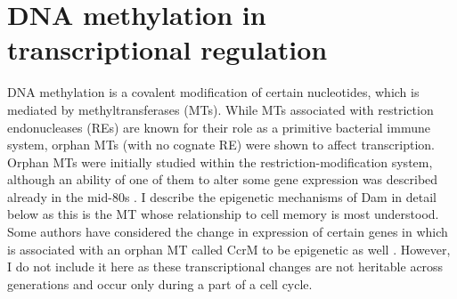 
\section{DNA methylation in transcriptional regulation}
DNA methylation is a covalent modification of certain nucleotides, which is mediated by methyltransferases (MTs).
While MTs associated with restriction endonucleases (REs) are known for their role as a primitive bacterial immune system, orphan MTs (with no cognate RE) were shown to affect transcription.
Orphan MTs were initially studied within the restriction-modification system, although an ability of one of them to alter some gene expression was described already in the mid-80s \cite{sternberg1985evidence, bickle1993biology}.
I describe the epigenetic mechanisms of Dam in detail below as this is the MT whose relationship to cell memory is most understood.
Some authors have considered the change in expression of certain genes in  which is associated with an orphan MT called CcrM to be epigenetic as well \cite{casadesus2006epigenetic, adhikari2016dna}.
However, I do not include it here as these transcriptional changes are not heritable across generations and occur only during a part of a cell cycle.

